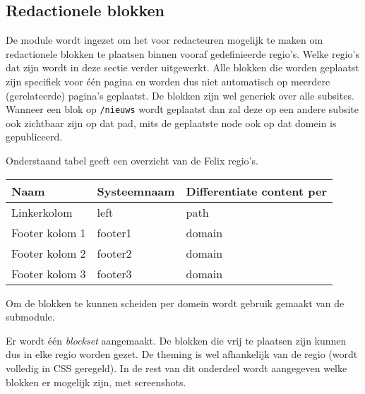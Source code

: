\subsection{Redactionele blokken}\label{felix}

De module  wordt ingezet om het voor redacteuren mogelijk te maken om redactionele blokken te plaatsen binnen vooraf gedefinieerde regio's. Welke regio's dat zijn wordt in deze sectie verder uitgewerkt. Alle blokken die worden geplaatst zijn specifiek voor \'{e}\'{e}n pagina en worden dus niet automatisch op meerdere (gerelateerde) pagina's geplaatst. De blokken zijn wel generiek over alle subsites. Wanneer een blok op \texttt{/nieuws} wordt geplaatst dan zal deze op een andere subsite ook zichtbaar zijn op dat pad, mits de geplaatste node ook op dat domein is gepubliceerd.

Onderstaand tabel geeft een overzicht van de Felix regio's.

\begin{tabularx}{\linewidth}{| p{5cm} | p{3cm} | X |}
\hline
\rowcolor{tableheader}
\textbf{Naam} & \textbf{Systeemnaam} & \textbf{Differentiate content per} \\ \hline
Linkerkolom & left & path \\ \hline
Footer kolom 1 & footer1 & domain \\ \hline
Footer kolom 2 & footer2 & domain \\ \hline
Footer kolom 3 & footer3 & domain \\ \hline
\end{tabularx}

Om de blokken te kunnen scheiden per domein wordt gebruik gemaakt van de  submodule.

Er wordt \'{e}\'{e}n \emph{blockset} aangemaakt. De blokken die vrij te plaatsen zijn kunnen dus in elke regio worden gezet. De theming is wel afhankelijk van de regio (wordt volledig in CSS geregeld). In de rest van dit onderdeel wordt aangegeven welke blokken er mogelijk zijn, met screenshots.

